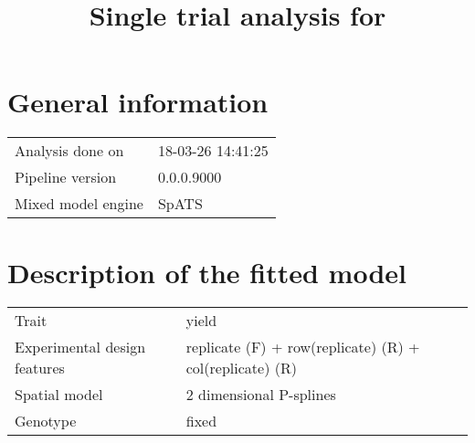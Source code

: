 \documentclass[a4paper,11pt]{article}\usepackage[]{graphicx}\usepackage[]{color}
\title{Single trial analysis for }%
\author{\vspace{-5ex}}
\date{\vspace{-5ex}}
\begin{document}



\maketitle

\singlespacing

\section{General information}
\begin{table}[ht]
\begin{flushleft}
\begin{tabular}{ll}
  Analysis done on & 18-03-26 14:41:25 \\ 
  Pipeline version & 0.0.0.9000 \\ 
  Mixed model engine & SpATS \\ 
  \end{tabular}
\label{general}
\end{flushleft}
\end{table}


\section{Description of the fitted model}

\begin{table}[ht]
\begin{flushleft}
\begin{tabular}{ll}
  Trait & yield \\ 
  Experimental design features & replicate (F) + row(replicate) (R) + col(replicate) (R) \\ 
  Spatial model & 2 dimensional P-splines \\ 
  Genotype & fixed \\ 
  \end{tabular}
\label{modelDescription}
\end{flushleft}
\end{table}
\end{document}
